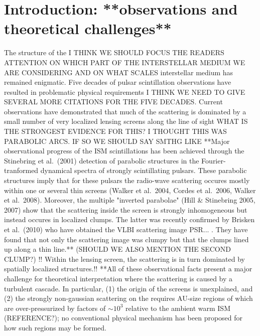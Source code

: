 \documentclass[useAMS,usenatbib]{mn2e}
\begin{document}
\section{Introduction: **observations and theoretical challenges**}

The structure of the I THINK WE SHOULD FOCUS THE READERS ATTENTION ON WHICH PART OF THE
INTERSTELLAR MEDIUM WE ARE CONSIDERING AND ON WHAT SCALES interstellar medium has remained enigmatic. Five
decades of pulsar scintillation observations \cite{1968Natur.218..920S}
have resulted in problematic physical requirements I THINK WE NEED TO GIVE SEVERAL MORE CITATIONS
FOR THE FIVE DECADES.  Current
observations have demonstrated that much of the scattering is
dominated by a small number of very localized lensing
screens \citep{2010ApJ...708..232B} along the line of sight WHAT IS THE STRONGEST EVIDENCE 
FOR THIS? I THOUGHT THIS WAS PARABOLIC ARCS. IF SO WE SHOULD SAY SMTHG LIKE
**Major observational progress of the ISM scintillations has been achieved through the
Stinebring et al.~(2001) detection of parabolic structures in the Fourier-tranformed dynamical
spectra of strongly scintillating pulsars. These parabolic structures imply that for these pulsars
the  radio-wave scattering
occures mostly within one or several thin screens (Walker et al.~2004, Cordes et al.~2006, 
Walker et al.~2008). Moreover, the multiple "inverted parabolae" (Hill \& Stinebring 2005, 2007)
show that the scattering inside the screen is strongly inhomogeneous but instead occures in localized
clumps. The latter was recently confirmed by Brisken et al.~(2010) who have obtained the VLBI scattering
 image PSR... . They have found that not only the scattering image was clumpy but that the clumps lined 
 up along a thin line.** (SHOULD WE ALSO MENTION THE SECOND CLUMP?)  !! Within
the lensing screen, the scattering is in turn dominated by spatially
localized structures.!!  **All of these observational facts
 present a major challenge for theoretical interpretation
where the scattering is caused by a turbulent cascade. In particular, (1) the origin of
the screens is unexplained, and (2) the strongly non-gaussian scattering on the  requires AU-size regions of which are over-pressurized by factors of $\sim 10^3$ relative to the ambient warm ISM (REFERENCE?); no
conventional physical mechanism has been proposed for how such regions may be formed.
\end{document}
